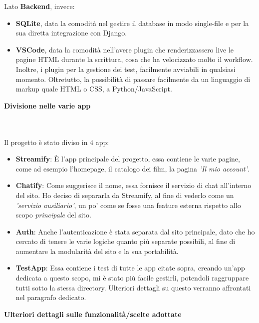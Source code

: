 \documentclass[12pt]{article}
\begin{document}
	\noindent Lato \textbf{Backend}, invece: 
	\begin{itemize}
		\item \textbf{SQLite}, data la comodità nel gestire il database in modo single-file e per la sua diretta integrazione con Django. \\
		
		\item \textbf{VSCode}, data la comodità nell'avere plugin che renderizzassero live le pagine HTML durante la scrittura, cosa che ha velocizzato molto il workflow. Inoltre, i plugin per la gestione dei test, facilmente avviabili in qualsiasi momento. Oltretutto, la possibilità di passare facilmente da un linguaggio di markup quale HTML o CSS, a Python/JavaScript.
	\end{itemize}
	\pagebreak

	
	\noindent \centerline {\Huge \textbf{Divisione nelle varie app}} \\ \\ 
	Il progetto è stato diviso in 4 app:
	
	\begin{itemize}
		\item \textbf{Streamify}: È l'app principale del progetto, essa contiene le varie pagine, come ad esempio l'homepage, il catalogo dei film, la pagina \textit{'Il mio account'}. 
		
		\item \textbf{Chatify}: Come suggerisce il nome, essa fornisce il servizio di chat all'interno del sito. Ho deciso di separarla da Streamify, al fine di vederlo come un \textit{'servizio ausiliario'}, un po' come se fosse una feature esterna rispetto allo scopo \textit{principale} del sito.
		
		\item \textbf{Auth}: Anche l'autenticazione è stata separata dal sito principale, dato che ho cercato di tenere le varie logiche quanto più separate possibili, al fine di aumentare la modularità del sito e la sua portabilità.
		
		\item \textbf{TestApp}: Essa contiene i test di tutte le app citate sopra, creando un'app dedicata a questo scopo, mi è stato più facile gestirli, potendoli raggruppare tutti sotto la stessa directory. Ulteriori dettagli su questo verranno affrontati nel paragrafo dedicato.
	\end{itemize}
	\pagebreak
	
	
	\noindent \centerline {\Huge \textbf{Ulteriori dettagli sulle funzionalità/scelte adottate}} \\ \\
	
\end{document}
